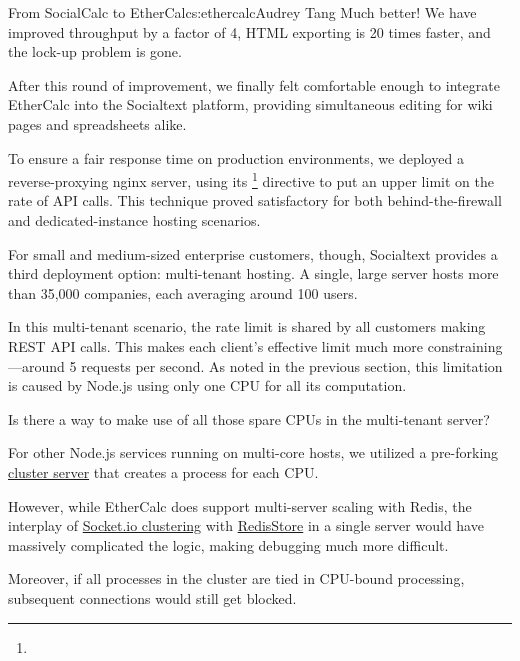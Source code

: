 \begin{aosachapter}{From SocialCalc to EtherCalc}{s:ethercalc}{Audrey Tang}
Much better! We have improved throughput by a factor of 4, HTML
exporting is 20 times faster, and the lock-up problem is gone.


After this round of improvement, we finally felt comfortable enough to
integrate EtherCalc into the Socialtext platform, providing simultaneous
editing for wiki pages and spreadsheets alike.

To ensure a fair response time on production environments, we deployed a
reverse-proxying nginx server, using its
\footnote{}
directive to put an upper limit on the rate of API calls. This technique
proved satisfactory for both behind-the-firewall and dedicated-instance
hosting scenarios.

For small and medium-sized enterprise customers, though, Socialtext
provides a third deployment option: multi-tenant hosting. A single,
large server hosts more than 35,000 companies, each averaging around 100
users.

In this multi-tenant scenario, the rate limit is shared by all customers
making REST API calls. This makes each client's effective limit much
more constraining---around 5 requests per second. As noted in the
previous section, this limitation is caused by Node.js using only one
CPU for all its computation.


Is there a way to make use of all those spare CPUs in the multi-tenant
server?

For other Node.js services running on multi-core hosts, we utilized a
pre-forking \href{https://npmjs.org/package/cluster-server}{cluster
server} that creates a process for each CPU.


However, while EtherCalc does support multi-server scaling with Redis,
the interplay of \href{http://stackoverflow.com/a/5749667}{Socket.io
clustering} with
\href{https://github.com/LearnBoost/Socket.IO/wiki/Configuring-Socket.IO}{RedisStore}
in a single server would have massively complicated the logic, making
debugging much more difficult.

Moreover, if all processes in the cluster are tied in CPU-bound
processing, subsequent connections would still get blocked.


\end{aosachapter}
